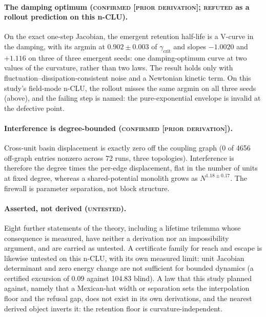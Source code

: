 \documentclass{article} %
\begin{document}
\paragraph{The damping optimum (\textsc{confirmed [prior derivation]}; \textsc{refuted} as a
rollout prediction on this n-CLU).} On the exact one-step Jacobian, the emergent retention
half-life is a V-curve in the damping, with its argmin at $0.902\pm0.003$ of
$\gamma_{\text{crit}}$ and slopes $-1.0020$ and $+1.116$ on three of three emergent seeds: one
damping-optimum curve at two values of the curvature, rather than two laws.
The result holds only with fluctuation--dissipation-consistent noise and a Newtonian kinetic term.
On this study's field-mode n-CLU, the rollout misses the same argmin on all three seeds (above), and the
failing step is named: the pure-exponential envelope is invalid at the defective point.

\paragraph{Interference is degree-bounded (\textsc{confirmed [prior derivation]}).} Cross-unit
basin displacement is exactly zero off the coupling graph (0 of 4656 off-graph entries nonzero
across 72 runs, three topologies). Interference is therefore the degree times the per-edge
displacement, flat in the number of units at fixed degree, whereas a shared-potential monolith
grows as $N^{1.18\pm0.17}$. The firewall is parameter separation, not block structure.

\paragraph{Asserted, not derived (\textsc{untested}).} Eight further statements of the theory,
including a lifetime trilemma whose consequence is measured, have neither a derivation nor an
impossibility argument, and are carried as untested. A certificate family for reach and escape is
likewise untested on this n-CLU, with its own measured limit: unit Jacobian determinant and zero
energy change are not sufficient for bounded dynamics (a certified excursion of 0.09 against
104.83 blind). %
A law that this study planned against, namely that a Mexican-hat width or separation sets
the interpolation floor and the refusal gap, does not exist in its own derivations, and the
nearest derived object inverts it: the retention floor is curvature-independent. %
\end{document}
